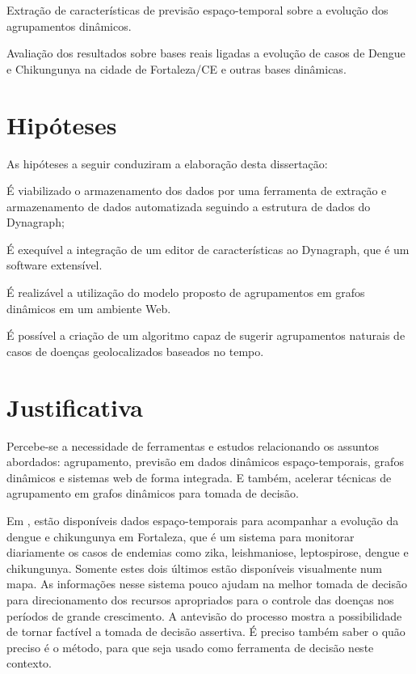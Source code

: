 \begin{alineas}
	\item Extração de características de previsão espaço-temporal sobre a evolução dos agrupamentos dinâmicos.
	\item Avaliação dos resultados sobre bases reais ligadas a evolução de casos de Dengue e Chikungunya na cidade de Fortaleza/CE e outras bases dinâmicas.
\end{alineas}

\section{Hipóteses}
As hipóteses a seguir conduziram a elaboração desta dissertação:
\begin{alineas}
    \item É viabilizado o armazenamento dos dados por uma ferramenta de extração e armazenamento de dados automatizada seguindo a estrutura de dados do Dynagraph;
	\item É exequível a integração de um editor de características ao Dynagraph, que é um software extensível.	
	\item É realizável a utilização do modelo proposto de agrupamentos em grafos dinâmicos em um ambiente Web.	
	\item É possível a criação de um algoritmo capaz de sugerir  agrupamentos naturais de casos de doenças geolocalizados baseados no tempo.
\end{alineas}

\section{Justificativa}
Percebe-se a necessidade de ferramentas e estudos 
relacionando os assuntos abordados: agrupamento, previsão em dados
dinâmicos espaço-temporais, grafos dinâmicos e sistemas web de forma integrada.
E também, acelerar técnicas de agrupamento em grafos dinâmicos para tomada de decisão.

Em \cite{simda}, estão disponíveis dados espaço-temporais para acompanhar a evolução da dengue e chikungunya em Fortaleza, que é um sistema para monitorar diariamente os casos de endemias como zika, leishmaniose, leptospirose, dengue e chikungunya. Somente estes dois últimos estão disponíveis visualmente num mapa. As informações nesse sistema pouco ajudam na melhor tomada de decisão para direcionamento dos recursos apropriados para o controle das doenças nos períodos de grande crescimento. A antevisão do processo mostra a possibilidade de tornar factível a tomada de decisão assertiva. É preciso também saber o quão preciso é o método, para que seja usado como ferramenta de decisão neste contexto.

